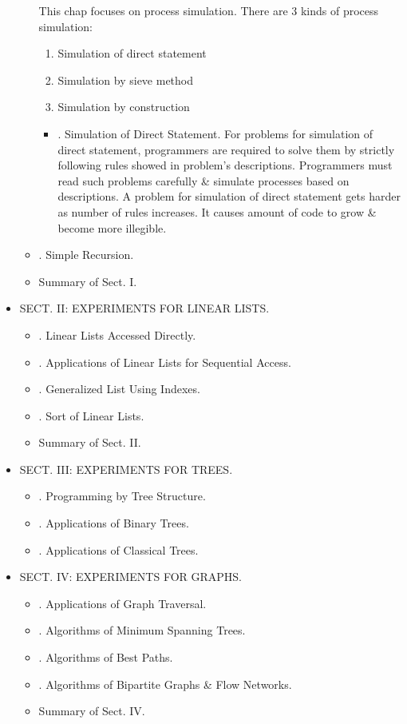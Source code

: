 \documentclass{article}
\begin{document}
\begin{itemize}
\begin{itemize}
		This chap focuses on process simulation. There are 3 kinds of process simulation:
		\begin{enumerate}
			\item Simulation of direct statement
			\item Simulation by sieve method
			\item Simulation by construction
		\end{enumerate}
		
		\begin{itemize}
			\item {. Simulation of Direct Statement.} For problems for simulation of direct statement, programmers are required to solve them by strictly following rules showed in problem's descriptions. Programmers must read such problems carefully \& simulate processes based on descriptions. A problem for simulation of direct statement gets harder as number of rules increases. It causes amount of code to grow \& become more illegible.
		\end{itemize}
		\item {. Simple Recursion.}
		\item {\sf Summary of Sect. I.}
	\end{itemize}
	\item {\sf SECT. II: EXPERIMENTS FOR LINEAR LISTS.}
	\begin{itemize}
		\item {. Linear Lists Accessed Directly.}
		\item {. Applications of Linear Lists for Sequential Access.}
		\item {. Generalized List Using Indexes.}
		\item {. Sort of Linear Lists.}
		\item {\sf Summary of Sect. II.}
	\end{itemize}
	\item {\sf SECT. III: EXPERIMENTS FOR TREES.}
	\begin{itemize}
		\item {. Programming by Tree Structure.}
		\item {. Applications of Binary Trees.}
		\item {. Applications of Classical Trees.}
	\end{itemize}
	\item {\sf SECT. IV: EXPERIMENTS FOR GRAPHS.}
	\begin{itemize}
		\item {. Applications of Graph Traversal.}
		\item {. Algorithms of Minimum Spanning Trees.}
		\item {. Algorithms of Best Paths.}
		\item {. Algorithms of Bipartite Graphs \& Flow Networks.}
		\item {\sf Summary of Sect. IV.}
	\end{itemize}
\end{itemize}
\end{document}
